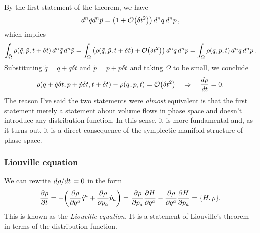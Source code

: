 \documentclass{article}
\begin{document}
By the first statement of the theorem, we have
\[
	\dd[n]\tilde{q}\dd[n]\tilde{p} = \qty(1 + \order{\delta t^{2}}) \dd[n]{q} \dd[n]{p},
\]
which implies
\[
	\int_{\tilde{\Omega}} \rho(\tilde{q}, \tilde{p}, t+\delta t) \dd[n]{\tilde{q}} \dd[n]{\tilde{p}} = \int_{\Omega} \qty(\rho(\tilde{q},\tilde{p},t+\delta t) + \order{\delta t^{2}}) \dd[n]{q}\dd[n]{p} = \int_{\Omega} \rho(q,p,t) \dd[n]{q}\dd[n]{p}.
\]
Substituting $ \tilde{q}=q+\dot{q}\delta t $ and $ \tilde{p} = p+\dot{p} \delta t $ and taking $ \Omega $ to be small, we conclude
\[
\rho(q+\dot{q}\delta t,p + \dot{p}\delta t, t+\delta t) - \rho(q,p,t) = \order{\delta t^{2}} \implies \dv{\rho}{t} = 0.
\]
The reason I've said the two statements were \textit{almost} equivalent is that the first statement merely a statement about volume flows in phase space and doesn't introduce any distribution function. In this sense, it is more fundamental and, as it turns out, it is a direct consequence of the symplectic manifold structure of phase space.
\subsubsection{Liouville equation}
We can rewrite $ \dv*{\rho}{t} = 0 $ in the form
\begin{equation}
	\pdv{\rho}{t} = -\qty(\pdv{\rho}{q^a} \dot{q}^a + \pdv{\rho}{p_{a}} \dot{p}_{a}) = \pdv{\rho}{p_{a}} \pdv{H}{q^a} - \pdv{\rho}{q^a} \pdv{H}{p_{a}} = \qty{H, \rho}.
\end{equation}
This is known as the \textit{Liouville equation.} It is a statement of Liouville's theorem in terms of the distribution function.
\end{document}
